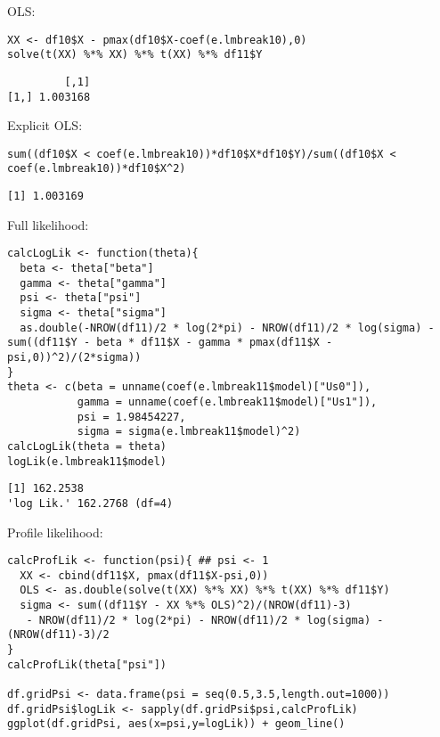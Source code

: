 \documentclass[12pt]{article}
\begin{document}
OLS:
\lstset{language=r,label= ,caption= ,captionpos=b,numbers=none}
\begin{lstlisting}
XX <- df10$X - pmax(df10$X-coef(e.lmbreak10),0)
solve(t(XX) %*% XX) %*% t(XX) %*% df11$Y
\end{lstlisting}

\begin{verbatim}
         [,1]
[1,] 1.003168
\end{verbatim}


Explicit OLS:
\lstset{language=r,label= ,caption= ,captionpos=b,numbers=none}
\begin{lstlisting}
sum((df10$X < coef(e.lmbreak10))*df10$X*df10$Y)/sum((df10$X < coef(e.lmbreak10))*df10$X^2)
\end{lstlisting}

\begin{verbatim}
[1] 1.003169
\end{verbatim}


Full likelihood:
\lstset{language=r,label= ,caption= ,captionpos=b,numbers=none}
\begin{lstlisting}
calcLogLik <- function(theta){
  beta <- theta["beta"]
  gamma <- theta["gamma"]
  psi <- theta["psi"]
  sigma <- theta["sigma"]
  as.double(-NROW(df11)/2 * log(2*pi) - NROW(df11)/2 * log(sigma) - sum((df11$Y - beta * df11$X - gamma * pmax(df11$X - psi,0))^2)/(2*sigma))
}
theta <- c(beta = unname(coef(e.lmbreak11$model)["Us0"]),
           gamma = unname(coef(e.lmbreak11$model)["Us1"]),
           psi = 1.98454227,
           sigma = sigma(e.lmbreak11$model)^2)
calcLogLik(theta = theta)
logLik(e.lmbreak11$model)
\end{lstlisting}

\begin{verbatim}
[1] 162.2538
'log Lik.' 162.2768 (df=4)
\end{verbatim}


Profile likelihood:
\lstset{language=r,label= ,caption= ,captionpos=b,numbers=none}
\begin{lstlisting}
calcProfLik <- function(psi){ ## psi <- 1
  XX <- cbind(df11$X, pmax(df11$X-psi,0))
  OLS <- as.double(solve(t(XX) %*% XX) %*% t(XX) %*% df11$Y)
  sigma <- sum((df11$Y - XX %*% OLS)^2)/(NROW(df11)-3)
   - NROW(df11)/2 * log(2*pi) - NROW(df11)/2 * log(sigma) - (NROW(df11)-3)/2
}
calcProfLik(theta["psi"])

df.gridPsi <- data.frame(psi = seq(0.5,3.5,length.out=1000))
df.gridPsi$logLik <- sapply(df.gridPsi$psi,calcProfLik)
ggplot(df.gridPsi, aes(x=psi,y=logLik)) + geom_line()
\end{lstlisting}
\end{document}
